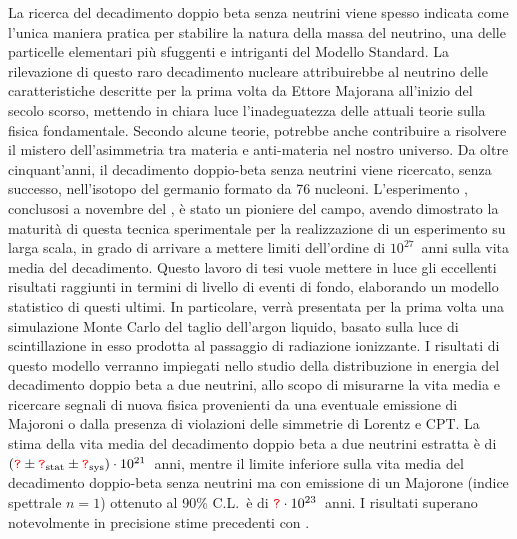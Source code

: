 
La ricerca del decadimento doppio beta senza neutrini viene spesso indicata come l'unica
maniera pratica per stabilire la natura della massa del neutrino, una delle particelle
elementari più sfuggenti e intriganti del Modello Standard. La rilevazione di questo raro
decadimento nucleare attribuirebbe al neutrino delle caratteristiche descritte per la
prima volta da Ettore Majorana all'inizio del secolo scorso, mettendo in chiara luce
l'inadeguatezza delle attuali teorie sulla fisica fondamentale. Secondo alcune teorie,
potrebbe anche contribuire a risolvere il mistero dell'asimmetria tra materia e
anti-materia nel nostro universo. Da oltre cinquant'anni, il decadimento doppio-beta senza
neutrini viene ricercato, senza successo, nell'isotopo del germanio formato da 76
nucleoni. L'esperimento \gerda, conclusosi a novembre del , è stato un pioniere
del campo, avendo dimostrato la maturità di questa tecnica sperimentale per la
realizzazione di un esperimento su larga scala, in grado di arrivare a mettere limiti
dell'ordine di $10^{27}$~anni sulla vita media del decadimento.  Questo lavoro di tesi
vuole mettere in luce gli eccellenti risultati raggiunti in termini di livello di eventi
di fondo, elaborando un modello statistico di questi ultimi. In particolare, verrà
presentata per la prima volta una simulazione Monte Carlo del taglio dell'argon liquido,
basato sulla luce di scintillazione in esso prodotta al passaggio di radiazione
ionizzante. I risultati di questo modello verranno impiegati nello studio della
distribuzione in energia del decadimento doppio beta a due neutrini, allo scopo di
misurarne la vita media e ricercare segnali di nuova fisica provenienti da una eventuale
emissione di Majoroni o dalla presenza di violazioni delle simmetrie di Lorentz e CPT. La
stima della vita media del decadimento doppio beta a due neutrini estratta è di
$(\textcolor{red}{\texttt{?}} \pm {\textcolor{red}{\texttt{?}}}_\text{stat} \pm {\textcolor{red}{\texttt{?}}}_\text{sys}) \cdot 10^{21}$~anni, mentre il
limite inferiore sulla vita media del decadimento doppio-beta senza neutrini ma con
emissione di un Majorone (indice spettrale $n=1$) ottenuto al 90\% C.L.~è di $\textcolor{red}{\texttt{?}}
\cdot 10^{23}$~anni. I risultati superano notevolmente in precisione stime precedenti con
\gesix.

